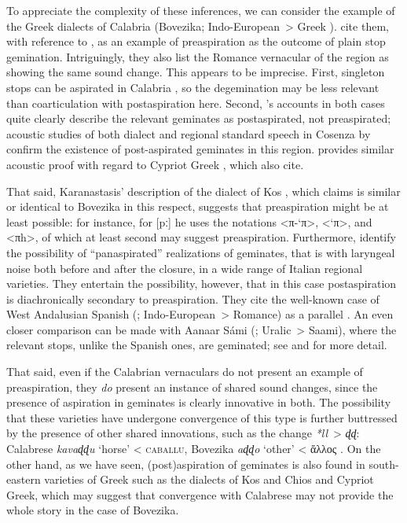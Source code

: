 \documentclass[output=paper,colorlinks,citecolor=brown]{langscibook}
\begin{document}
To appreciate the complexity of these inferences, we can consider the example of the Greek dialects of Calabria (Bovezika; Indo-European~> Greek ). \Textcite{blevins1993ponapeic} cite them, with reference to \textcite{falcone1973il}, as an example of preaspiration as the outcome of plain stop gemination. Intriguingly, they also list the Romance vernacular of the region \parencite{falcone1976calabria} as showing the same sound change. This appears to be imprecise. First, singleton {\VOICELESS} stops can be aspirated in Calabria \parencite[e.\,g.][]{mele2009fonetica}, so the degemination may be less relevant than coarticulation with postaspiration here. Second, \citeauthor{falcone1976calabria}'s accounts in both cases quite clearly describe the relevant geminates as postaspirated, not preaspirated; acoustic studies of both dialect and regional standard speech in Cosenza by \textcite{sorianello1996indici, stevens2010post} confirm the existence of post\hyp aspirated geminates in this region. \Textcite{armostis2009cypriot} provides similar acoustic proof with regard to Cypriot Greek \parencite{newton1972cypriot}, which \textcite{blevins1993ponapeic} also cite.

That  said, Karanastasis' description of the dialect of Kos \parencite[77--78]{karanastasis1964kos}, which \textcite{falcone1973il, falcone1976calabria} claims is similar or identical to Bovezika in this respect, suggests that preaspiration might be at least possible: for instance, for [pː] he uses the notations <π-‘π>, <‘π>, and <πh>, of which at least second may suggest preaspiration. Furthermore, \textcite{stevens2010post} identify the possibility of \enquote{panaspirated} realizations of {\VOICELESS} geminates, that is with laryngeal noise both before and after the closure, in a wide range of Italian regional varieties. They entertain the possibility, however, that in this case postaspiration is diachronically secondary to preaspiration. They cite the well\hyp known case of West Andalusian Spanish (; Indo\hyp European~> Romance)  as a parallel \parencite[e.\,g.][]{Torreira_2012, Ruch_2014}. An even closer comparison can  be made with Aanaar Sámi (; Uralic~> Saami), where the relevant stops, unlike the Spanish ones, are geminated; see \textcite{iosad2022preaspirasjon} and \textcite{iosad2020phonological} for more detail.

That said, even if the Calabrian vernaculars do not present an example of preaspiration, they \emph{do} present an instance of shared sound changes, since the presence of aspiration in geminates is clearly innovative in both. The possibility that these varieties have undergone convergence of this type is further buttressed by the presence of other shared innovations, such as the change \textit{*ll}~> \textit{ɖɖ}: Calabrese \textit{kavaɖɖu} `horse' < \textsc{caballu}, Bovezika \textit{aɖɖo} `other' < ἄλλος \parencites[54]{falcone1976calabria}[185]{falcone1973il}. On the other hand, as we have seen, (post)aspiration of geminates is also found in south-eastern varieties of Greek such as the dialects of Kos and Chios and Cypriot Greek, which may suggest that convergence with Calabrese may not provide the whole story in the case of Bovezika.
\end{document}
